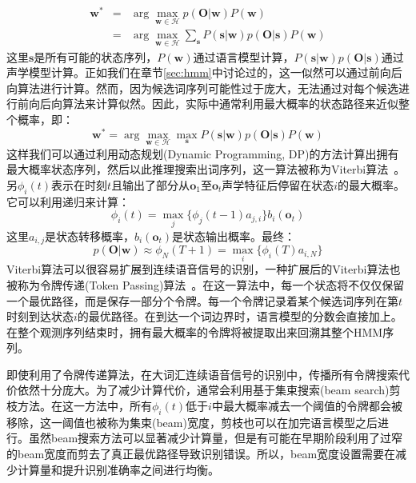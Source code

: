 \begin{eqnarray}
\mathbf{w}^* &=& \arg \max_{\mathbf{w} \in \mathcal{H}}p(\mathbf{O}|\mathbf{w})P(\mathbf{w}) \\
&=& \arg \max_{\mathbf{w} \in \mathcal{H}} \sum_{\mathbf{s}} P(\mathbf{s}|\mathbf{w})p(\mathbf{O}|\mathbf{s})P(\mathbf{w})
\end{eqnarray}
这里$\mathbf{s}$是所有可能的状态序列，$P(\mathbf{w})$通过语言模型计算，$P(\mathbf{s}|\mathbf{w})p(\mathbf{O}|\mathbf{s})$通过声学模型计算。正如我们在章节\ref{sec:hmm}中讨论过的，这一似然可以通过前向后向算法进行计算。然而，因为候选词序列可能性过于庞大，无法通过对每个候选进行前向后向算法来计算似然。因此，实际中通常利用最大概率的状态路径来近似整个概率，即：
\begin{equation}
\label{eq:decode}
\mathbf{w}^* = \arg \max_{\mathbf{w} \in \mathcal{H}} \max_{\mathbf{s}} P(\mathbf{s}|\mathbf{w})p(\mathbf{O}|\mathbf{s})P(\mathbf{w})
\end{equation}
这样我们可以通过利用动态规划(Dynamic Programming, DP)的方法计算出拥有最大概率状态序列，然后以此推理搜索出词序列，这一算法被称为Viterbi算法~\cite{viterbi1967error}。另$\phi_i(t)$表示在时刻$t$且输出了部分从$\mathbf{o}_1$至$\mathbf{o}_t$声学特征后停留在状态$i$的最大概率。它可以利用递归来计算：
\begin{equation}
    \phi_i(t)=\max_j\{\phi_j(t-1)a_{j,i}\}b_i(\mathbf{o}_t)
\end{equation}
这里$a_{i,j}$是状态转移概率，$b_i(\mathbf{o}_t)$是状态输出概率。最终：
\begin{equation}
    p(\mathbf{O}|\mathbf{w}) \approx \phi_{N}(T+1) = \max_i\{\phi_i(T)a_{i,N}\}
\end{equation}
Viterbi算法可以很容易扩展到连续语音信号的识别，一种扩展后的Viterbi算法也被称为令牌传递(Token Passing)算法~\cite{young2002htk}。在这一算法中，每一个状态将不仅仅保留一个最优路径，而是保存一部分个令牌。每一个令牌记录着某个候选词序列在第$t$时刻到达状态$i$的最优路径。在到达一个词边界时，语言模型的分数会直接加上。在整个观测序列结束时，拥有最大概率的令牌将被提取出来回溯其整个HMM序列。

即使利用了令牌传递算法，在大词汇连续语音信号的识别中，传播所有令牌搜索代价依然十分庞大。为了减少计算代价，通常会利用基于集束搜索(beam search)剪枝方法。在这一方法中，所有$\phi_i(t)$低于$i$中最大概率减去一个阈值的令牌都会被移除，这一阈值也被称为集束(beam)宽度，剪枝也可以在加完语言模型之后进行。虽然beam搜索方法可以显著减少计算量，但是有可能在早期阶段利用了过窄的beam宽度而剪去了真正最优路径导致识别错误。所以，beam宽度设置需要在减少计算量和提升识别准确率之间进行均衡。

